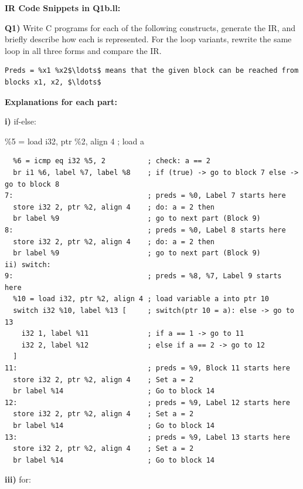 \medskip\noindent\textbf{IR Code Snippets in Q1b.ll:}\par

\textbf{Q1)} Write C programs for each of the following constructs, generate the IR, and briefly describe how each is represented. For the loop variants, rewrite the same loop in all three forms and compare the IR.


\begin{lstlisting}
Preds = %x1 %x2$\ldots$ means that the given block can be reached from blocks x1, x2, $\ldots$
\end{lstlisting}

\textbf{Explanations for each part:}


\textbf{i)} if-else:


  \%5 = load i32, ptr \%2, align 4   ; load a


\begin{lstlisting}
  %6 = icmp eq i32 %5, 2          ; check: a == 2
  br i1 %6, label %7, label %8    ; if (true) -> go to block 7 else -> go to block 8
7:                                ; preds = %0, Label 7 starts here
  store i32 2, ptr %2, align 4    ; do: a = 2 then
  br label %9                     ; go to next part (Block 9)
8:                                ; preds = %0, Label 8 starts here
  store i32 2, ptr %2, align 4    ; do: a = 2 then
  br label %9                     ; go to next part (Block 9)
ii) switch:
9:                                ; preds = %8, %7, Label 9 starts here
  %10 = load i32, ptr %2, align 4 ; load variable a into ptr 10
  switch i32 %10, label %13 [     ; switch(ptr 10 = a): else -> go to 13
    i32 1, label %11              ; if a == 1 -> go to 11
    i32 2, label %12              ; else if a == 2 -> go to 12
  ]
11:                               ; preds = %9, Block 11 starts here
  store i32 2, ptr %2, align 4    ; Set a = 2
  br label %14                    ; Go to block 14
12:                               ; preds = %9, Label 12 starts here
  store i32 2, ptr %2, align 4    ; Set a = 2
  br label %14                    ; Go to block 14
13:                               ; preds = %9, Label 13 starts here
  store i32 2, ptr %2, align 4    ; Set a = 2
  br label %14                    ; Go to block 14
\end{lstlisting}

\textbf{iii)} for: 


